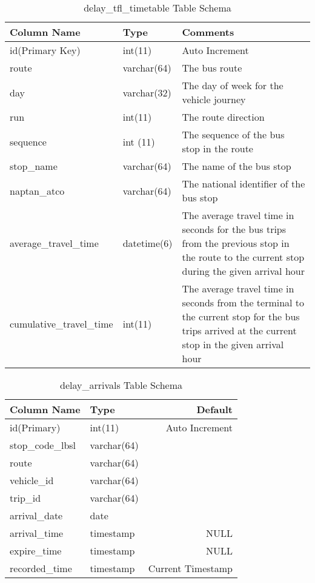 \begin{table}
\centering
\begin{tabular}{@{}llp{6cm}@{}} \toprule
Column Name & Type & Comments\\ \midrule
id(Primary Key) & int(11)  & Auto Increment\\ [0.4cm]
route & varchar(64) & The bus route \\ [0.4cm]
day & varchar(32) & The day of week for the vehicle journey \\ [0.4cm]
run & int(11) & The route direction \\ [0.4cm]
sequence & int (11) & The sequence of the bus stop in the route \\ [0.4cm]
stop\_name & varchar(64) & The name of the bus stop \\ [0.4cm]
naptan\_atco & varchar(64) & The national identifier of the bus stop \\ [0.4cm]
average\_travel\_time & datetime(6) & The average travel time in seconds for the bus trips from the previous stop in the route to the current stop during the given arrival hour \\ [0.4cm]
cumulative\_travel\_time & int(11) & The average travel time in seconds from the terminal to the current stop for the bus trips arrived at the current stop in the given arrival hour \\
\bottomrule
\end{tabular}
\caption{delay\_tfl\_timetable Table Schema}
\label{table:delay_tfl_timetable}
\end{table}


\begin{table}
\centering
\begin{tabular}{@{}llr@{}} \toprule
Column Name & Type & Default \\ \midrule
id(Primary) & int(11) & Auto Increment \\
stop\_code\_lbsl & varchar(64) &  \\
route & varchar(64) &  \\
vehicle\_id & varchar(64) & \\
trip\_id & varchar(64) & \\
arrival\_date & date &  \\
arrival\_time & timestamp & NULL \\
expire\_time & timestamp & NULL \\
recorded\_time & timestamp & Current Timestamp \\ \bottomrule
\end{tabular}
\caption{delay\_arrivals Table Schema}
\label{table:delay_arrivals_schema}
\end{table}

